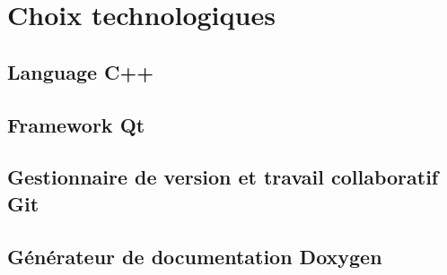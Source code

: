 \chapter{Choix technologiques}
    \section{Language C++}
        \lipsum[1-2]

    \section{Framework Qt}
        \lipsum[1-2]


    \section{Gestionnaire de version et travail collaboratif Git}
        \lipsum[1-2]


    \section{Générateur de documentation Doxygen}
        \lipsum[1-2]
